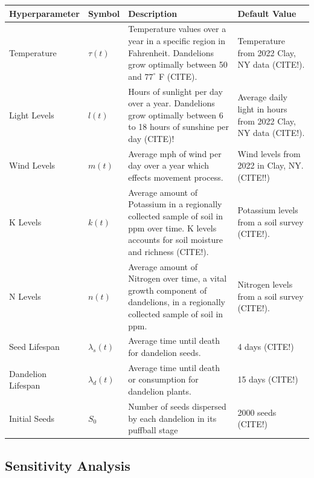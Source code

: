 \begin{table}[h]
\renewcommand{\arraystretch}{1.3}
    \begin{tabularx}{\textwidth}{p{}lp{}X}
    \toprule
    \textbf{Hyperparameter}  & \textbf{Symbol} & \textbf{Description} & \textbf{Default Value} \\ \midrule
    \raggedright Temperature & \(\tau(t)\)   & Temperature values over a year in a specific region in Fahrenheit. Dandelions grow optimally between 50 and \(77^\circ\) F (CITE). & Temperature from 2022 Clay, NY data (CITE!). \\
    \rowcolor{gray!15}
    \raggedright Light Levels & \(l(t)\)  & Hours of sunlight per day over a year. Dandelions grow optimally between 6 to 18 hours of sunshine per day (CITE)! & Average daily light in hours from 2022 Clay, NY data (CITE!).\\
    \raggedright Wind Levels & \(m(t)\) & Average mph of wind per day over a year which effects movement process. & Wind levels from 2022 in Clay, NY.  (CITE!!)\\
   \rowcolor{gray!15} \raggedright K Levels & \(k(t)\) & Average amount of Potassium in a regionally collected sample of soil in ppm over time. K levels accounts for soil moisture and richness (CITE!). & Potassium levels from a soil survey (CITE!).\\
      \raggedright N Levels & \(n(t)\) & Average amount of Nitrogen over time, a vital growth component of dandelions, in a regionally collected sample of soil in ppm. & Nitrogen levels from a soil survey (CITE!).\\
    \rowcolor{gray!15} \raggedright Seed Lifespan & \(\lambda_s(t)\) & Average time until death for dandelion seeds. & 4 days (CITE!) \\
    \raggedright Dandelion Lifespan & \(\lambda_d(t)\) & Average time until death or consumption for dandelion plants. & 15 days (CITE!) \\
     \rowcolor{gray!15} \raggedright Initial Seeds & \(S_0\) & Number of seeds dispersed by each dandelion in its puffball stage & 2000 seeds (CITE!)\\
    \bottomrule
    \end{tabularx}
\end{table}

\subsection{Sensitivity Analysis}


